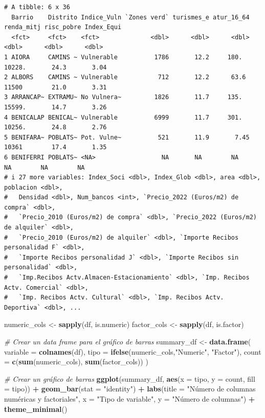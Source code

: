 \documentclass[notspecified,article,submit,moreauthors,pdftex]{Definitions/mdpi}
\newenvironment{Shaded}{\begin{snugshade}}{\end{snugshade}}
\newcommand{\AttributeTok}[1]{\textcolor[rgb]{0.13,0.29,0.53}{#1}}
\newcommand{\CommentTok}[1]{\textcolor[rgb]{0.56,0.35,0.01}{\textit{#1}}}
\newcommand{\FunctionTok}[1]{\textcolor[rgb]{0.13,0.29,0.53}{\textbf{#1}}}
\newcommand{\NormalTok}[1]{#1}
\newcommand{\OtherTok}[1]{\textcolor[rgb]{0.56,0.35,0.01}{#1}}
\newcommand{\SpecialCharTok}[1]{\textcolor[rgb]{0.81,0.36,0.00}{\textbf{#1}}}
\newcommand{\StringTok}[1]{\textcolor[rgb]{0.31,0.60,0.02}{#1}}
\begin{document}
\begin{verbatim}
# A tibble: 6 x 36
  Barrio    Distrito Indice_Vuln `Zones verd` turismes_e atur_16_64 renda_mitj risc_pobre Index_Equi
  <fct>     <fct>    <fct>              <dbl>      <dbl>      <dbl>      <dbl>      <dbl>      <dbl>
1 AIORA     CAMINS ~ Vulnerable          1786       12.2     180.       10228.       24.3       3.04
2 ALBORS    CAMINS ~ Vulnerable           712       12.2      63.6      11500        21.0       3.31
3 ARRANCAP~ EXTRAMU~ No Vulnera~         1826       11.7     135.       15599.       14.7       3.26
4 BENICALAP BENICAL~ Vulnerable          6999       11.7     301.       10256.       24.8       2.76
5 BENIFARA~ POBLATS~ Pot. Vulne~          521       11.9       7.45     10361        17.4       1.35
6 BENIFERRI POBLATS~ <NA>                  NA       NA        NA           NA        NA        NA   
# i 27 more variables: Index_Soci <dbl>, Index_Glob <dbl>, area <dbl>, poblacion <dbl>,
#   Densidad <dbl>, Num_bancos <int>, `Precio_2022 (Euros/m2) de compra` <dbl>,
#   `Precio_2010 (Euros/m2) de compra` <dbl>, `Precio_2022 (Euros/m2) de alquiler` <dbl>,
#   `Precio_2010 (Euros/m2) de alquiler` <dbl>, `Importe Recibos personalidad F` <dbl>,
#   `Importe Recibos personalidad J` <dbl>, `Importe Recibos sin personalidad` <dbl>,
#   `Imp.Recibos Actv.Almacen-Estacionamiento` <dbl>, `Imp. Recibos Actv. Comercial` <dbl>,
#   `Imp. Recibos Actv. Cultural` <dbl>, `Imp. Recibos Actv. Deportiva` <dbl>, ...
\end{verbatim}

\begin{Shaded}
\begin{Highlighting}[]
\NormalTok{numeric\_cols }\OtherTok{\textless{}{-}} \FunctionTok{sapply}\NormalTok{(df, is.numeric)}
\NormalTok{factor\_cols }\OtherTok{\textless{}{-}} \FunctionTok{sapply}\NormalTok{(df, is.factor)}

\CommentTok{\# Crear un data frame para el gráfico de barras}
\NormalTok{summary\_df }\OtherTok{\textless{}{-}} \FunctionTok{data.frame}\NormalTok{(}
  \AttributeTok{variable =} \FunctionTok{colnames}\NormalTok{(df),}
  \AttributeTok{tipo =} \FunctionTok{ifelse}\NormalTok{(numeric\_cols,}\StringTok{"Numeric"}\NormalTok{, }\StringTok{"Factor"}\NormalTok{),}
  \AttributeTok{count =} \FunctionTok{c}\NormalTok{(}\FunctionTok{sum}\NormalTok{(numeric\_cols), }\FunctionTok{sum}\NormalTok{(factor\_cols))}
\NormalTok{)}

\CommentTok{\# Crear un gráfico de barras}
\FunctionTok{ggplot}\NormalTok{(summary\_df, }\FunctionTok{aes}\NormalTok{(}\AttributeTok{x =}\NormalTok{ tipo, }\AttributeTok{y =}\NormalTok{ count, }\AttributeTok{fill =}\NormalTok{ tipo)) }\SpecialCharTok{+}
  \FunctionTok{geom\_bar}\NormalTok{(}\AttributeTok{stat =} \StringTok{"identity"}\NormalTok{) }\SpecialCharTok{+}
  \FunctionTok{labs}\NormalTok{(}\AttributeTok{title =} \StringTok{"Número de columnas numéricas y factoriales"}\NormalTok{,}
       \AttributeTok{x =} \StringTok{"Tipo de variable"}\NormalTok{,}
       \AttributeTok{y =} \StringTok{"Número de columnas"}\NormalTok{) }\SpecialCharTok{+}
  \FunctionTok{theme\_minimal}\NormalTok{()}
\end{Highlighting}
\end{Shaded}
\end{document}
